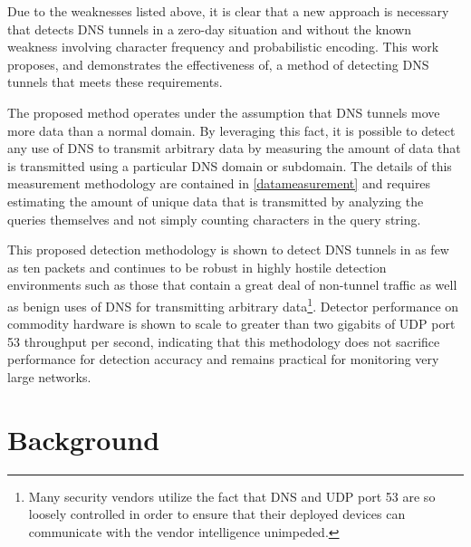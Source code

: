 \documentclass[12pt]{article}
\theoremstyle{remark}
\theoremstyle{definition}
\theoremstyle{definition}
\theoremstyle{definition}
\begin{document}
Due to the weaknesses listed above, it is clear that a new approach is
necessary that detects DNS tunnels in a zero-day situation and without the known
weakness involving character frequency and probabilistic encoding. This work
proposes, and demonstrates the effectiveness of, a method of detecting DNS
tunnels that meets these requirements.

The proposed method operates under the assumption that DNS tunnels move more
data than a normal domain. By leveraging this fact, it is possible to detect
any use of DNS to transmit arbitrary data by measuring the amount of data that
is transmitted using a particular DNS domain or subdomain. The details of this
measurement methodology are contained in \ref{datameasurement} and requires
estimating the amount of unique data that is transmitted by analyzing the
queries themselves and not simply counting characters in the query string.

This proposed detection methodology is shown to detect DNS tunnels in as few as
ten packets and continues to be robust in highly hostile detection environments
such as those that contain a great deal of non-tunnel traffic as well as benign
uses of DNS for transmitting arbitrary data\footnote{Many security vendors
utilize the fact that DNS and UDP port 53 are so loosely controlled in order to
ensure that their deployed devices can communicate with the vendor intelligence
unimpeded.}. Detector performance on commodity hardware is shown to scale to
greater than two gigabits of UDP port 53 throughput per second, indicating that
this methodology does not sacrifice performance for detection accuracy and
remains practical for monitoring very large networks.

\newpage

\section{Background}
\end{document}

